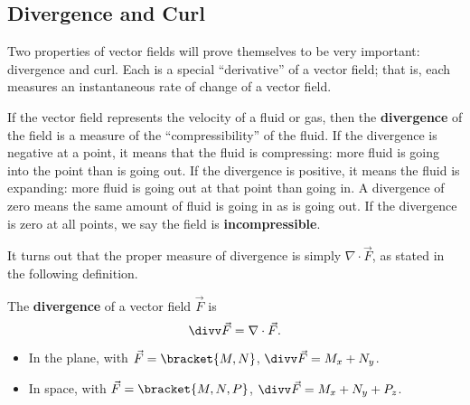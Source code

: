 \subsection{Divergence and Curl}

Two properties of vector fields will prove themselves to be very important: divergence and curl. Each is a special ``derivative'' of a vector field; that is, each measures an instantaneous rate of change of a vector field.

If the vector field represents the velocity of a fluid or gas, then the \textbf{divergence} of the field is a measure of the ``compressibility'' of the fluid. If the divergence is negative at a point, it means that the fluid is compressing: more fluid is going into the point than is going out. If the divergence is positive, it means the fluid is expanding: more fluid is going out at that point than going in. A divergence of zero means the same amount of fluid is going in as is going out. If the divergence is zero at all points, we say the field is \textbf{incompressible}.

It turns out that the proper measure of divergence is simply $\nabla \cdot \vec F$, as stated in the following definition.

\begin{definition}\label{def:divergence}
The \textbf{divergence} of a vector field $\vec F$ is
\[\divv \vec F = \nabla \cdot \vec F.\]
\begin{itemize}
	\item In the plane, with $\vec F =\bracket{M,N}$, $\divv \vec F = M_x+N_y$.
	\item	In space, with $\vec F =\bracket{M,N,P}$, $\divv \vec F = M_x+N_y+P_z$.
\end{itemize}
\end{definition}


